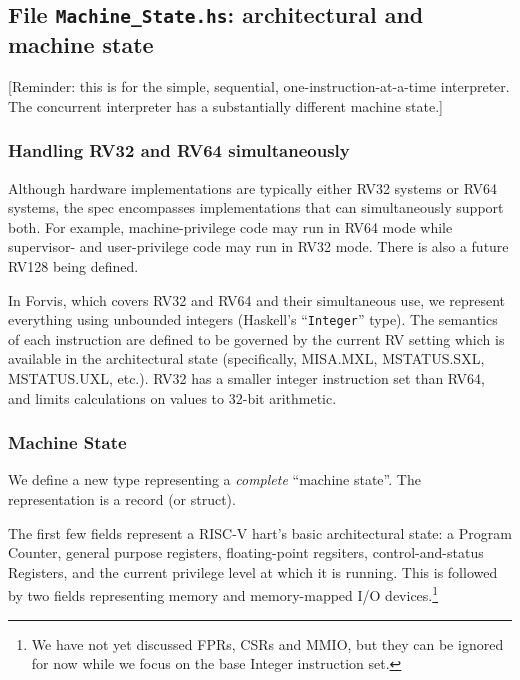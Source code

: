 \documentclass[11pt]{article}
\begin{document}
\subsection{File {\tt Machine\_State.hs}: architectural and machine state}

\label{sec_machine_state}

[Reminder: this is for the simple, sequential,
one-instruction-at-a-time interpreter.  The concurrent interpreter has
a substantially different machine state.]


\subsubsection{Handling RV32 and RV64 simultaneously}

Although hardware implementations are typically either RV32 systems or
RV64 systems, the spec encompasses implementations that can
simultaneously support both.  For example, machine-privilege code may
run in RV64 mode while supervisor- and user-privilege code may run in
RV32 mode.  There is also a future RV128 being defined.

In Forvis, which covers RV32 and RV64 and their simultaneous use, we
represent everything using unbounded integers (Haskell's
``\verb|Integer|'' type).  The semantics of each instruction are
defined to be governed by the current RV setting which is available in
the architectural state (specifically, MISA.MXL, MSTATUS.SXL,
MSTATUS.UXL, etc.).  RV32 has a smaller integer instruction set than
RV64, and limits calculations on values to 32-bit arithmetic.


\subsubsection{Machine State}

We define a new type representing a \emph{complete} ``machine state''.
The representation is a record (or struct).



The first few fields represent a RISC-V hart's basic architectural
state: a Program Counter, general purpose registers, floating-point
regsiters, control-and-status Registers, and the current privilege
level at which it is running. This is followed by two fields
representing memory and memory-mapped I/O devices.\footnote{We have
not yet discussed FPRs, CSRs and MMIO, but they can be ignored for now
while we focus on the base Integer instruction set.}
\end{document}
